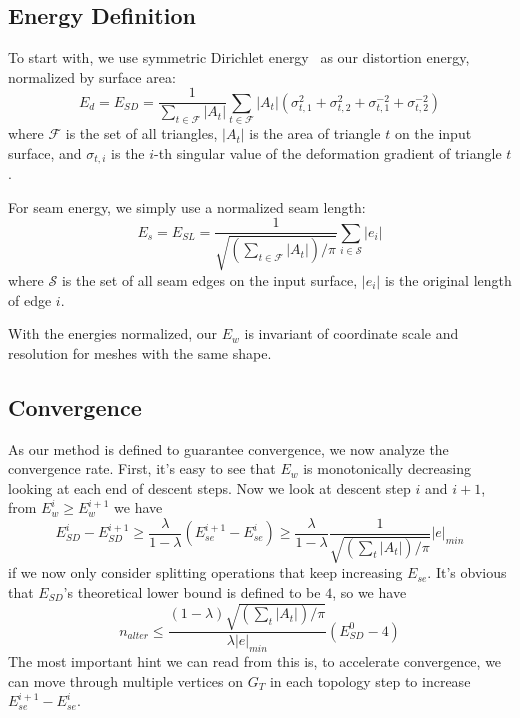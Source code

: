 \subsection{Energy Definition}

To start with, we use symmetric Dirichlet energy~\cite{Smith2015Bijective} as our distortion energy, normalized by surface area:
\[ E_d = E_{SD} = \frac{1}{\sum_{t\in\mathcal{F}} |A_t|} \sum_{t\in\mathcal{F}} |A_t|(\sigma_{t,1}^2 + \sigma_{t,2}^2 + \sigma_{t,1}^{-2} + \sigma_{t,2}^{-2}) \]
where $\mathcal{F}$ is the set of all triangles, $|A_t|$ is the area of triangle $t$ on the input surface, and $\sigma_{t,i}$ is the $i$-th singular value of the deformation gradient of triangle $t$.

For seam energy, we simply use a normalized seam length:
\[ E_s = E_{SL} = \frac{1}{\sqrt{(\sum_{t\in\mathcal{F}} |A_t|)/\pi}} \sum_{i \in \mathcal{S}} |e_i| \]
where $\mathcal{S}$ is the set of all seam edges on the input surface, $|e_i|$ is the original length of edge $i$.

With the energies normalized, our $E_w$ is invariant of coordinate scale and resolution for meshes with the same shape.







\subsection{Convergence}
\label{sec:convergence}

As our method is defined to guarantee convergence, we now analyze the convergence rate. First, it's easy to see that $E_w$ is monotonically decreasing looking at each end of descent steps. Now we look at descent step $i$ and $i+1$, from $E^i_w \geq E^{i+1}_w$ we have
\[ E^i_{SD} - E^{i+1}_{SD} \geq \frac{\lambda}{1-\lambda} (E^{i+1}_{se} - E^i_{se}) \geq \frac{\lambda}{1-\lambda} \frac{1}{\sqrt{(\sum_t |A_t|)/\pi}} |e|_{min} \]
if we now only consider splitting operations that keep increasing $E_{se}$. It's obvious that $E_{SD}$'s theoretical lower bound is defined to be $4$, so we have
\[ n_{alter} \leq \frac{(1-\lambda)\sqrt{(\sum_t |A_t|)/\pi}}{\lambda|e|_{min}} (E^0_{SD} - 4) \]
The most important hint we can read from this is, to accelerate convergence, we can move through multiple vertices on $G_T$ in each topology step to increase $E^{i+1}_{se} - E^i_{se}$.

